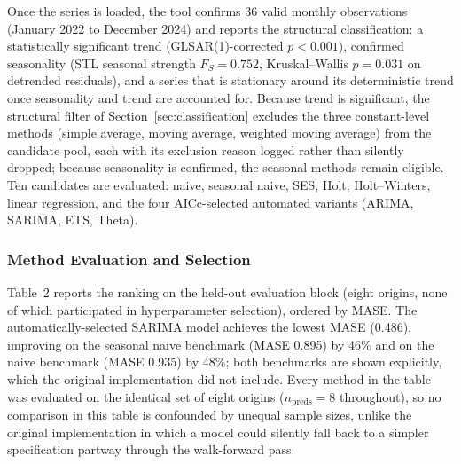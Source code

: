 \documentclass[forecasting,article,submit,pdftex,moreauthors]{Definitions/mdpi}
\begin{document}
Once the series is loaded, the tool confirms 36 valid monthly observations (January 2022 to December 2024) and reports the structural classification: a statistically significant trend (GLSAR(1)-corrected $p<0.001$), confirmed seasonality (STL seasonal strength $F_S=0.752$, Kruskal--Wallis $p=0.031$ on detrended residuals), and a series that is stationary around its deterministic trend once seasonality and trend are accounted for. Because trend is significant, the structural filter of Section~\ref{sec:classification} excludes the three constant-level methods (simple average, moving average, weighted moving average) from the candidate pool, each with its exclusion reason logged rather than silently dropped; because seasonality is confirmed, the seasonal methods remain eligible. Ten candidates are evaluated: naive, seasonal naive, SES, Holt, Holt--Winters, linear regression, and the four AICc-selected automated variants (ARIMA, SARIMA, ETS, Theta).

\subsubsection{Method Evaluation and Selection}

Table~2 reports the ranking on the held-out evaluation block (eight origins, none of which participated in hyperparameter selection), ordered by MASE. The automatically-selected SARIMA model achieves the lowest MASE (0.486), improving on the seasonal naive benchmark (MASE 0.895) by 46\% and on the naive benchmark (MASE 0.935) by 48\%; both benchmarks are shown explicitly, which the original implementation did not include. Every method in the table was evaluated on the identical set of eight origins ($n_{\text{preds}}=8$ throughout), so no comparison in this table is confounded by unequal sample sizes, unlike the original implementation in which a model could silently fall back to a simpler specification partway through the walk-forward pass.
\end{document}
